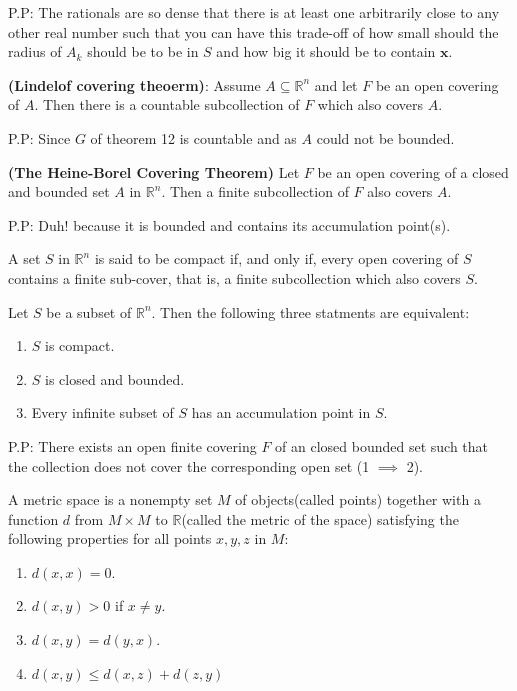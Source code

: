 \documentclass[10pt,a4paper]{book}
\begin{document}
\noindent P.P: The rationals are so dense that there is at least one arbitrarily close to any other real number such that you can have this trade-off of how small should the radius of $A_k$ should be to be in $S$ and how big it should be to contain $\mathbf{x}$.
\begin{Thm}
\textbf{(Lindelof covering theoerm)}: Assume $A\subseteq \mathbb{R}^n$ and let $F$ be an open covering of $A$. Then there is a countable subcollection of $F$ which also covers $A$.
\end{Thm}
\noindent P.P: Since $G$ of theorem 12 is countable and as $A$ could not be bounded.
\begin{Thm}
	\textbf{(The Heine-Borel Covering Theorem)} Let $F$ be an open covering of a closed and bounded set $A$ in $\mathbb{R}^n$. Then a finite subcollection of $F$ also covers $A$.
\end{Thm}
\noindent P.P: Duh! because it is bounded and contains its accumulation point(s).
\begin{deff}
	A set $S$ in $\mathbb{R}^n$ is said to be compact if, and only if, every open covering of $S$ contains a finite sub-cover, that is, a finite subcollection which also covers $S$.
\end{deff}
\begin{Thm}
	Let $S$ be a subset of $\mathbb{R}^n$. Then the following three statments are equivalent:
		\begin{enumerate}
			\item $S$ is compact.
			\item $S$ is closed and bounded.
			\item  Every infinite subset of $S$ has an accumulation point in $S$.
		\end{enumerate}
\end{Thm}
\noindent P.P: There exists an open finite covering $F$ of an closed bounded set such that the collection does not cover the corresponding open set (1 $\implies$ 2).
\begin{deff}
	A metric space is a nonempty set $M$ of objects(called points) together with a function $d$ from $M \times M$ to $\mathbb{R}$(called the metric of the space) satisfying the following properties for all points $x,y,z$ in $M$:
	\begin{enumerate}
		\item $d(x,x) = 0$.
		\item $d(x,y) > 0$ if $x \neq y$.
		\item $d(x,y) = d(y,x)$.
		\item $d(x,y) \leq d(x,z) + d(z,y)$
	\end{enumerate}
\end{deff}
\end{document}
